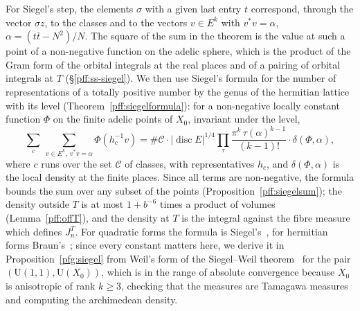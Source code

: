 \documentclass[10pt]{amsart}
\theoremstyle{definition}
\theoremstyle{remark}
\providecommand{\auU}{\mathrm U}
\begin{document}
For Siegel's step, the elements $\sigma$ with a given last entry $t$ correspond, through the
vector $\sigma z$, to the classes and to the vectors $v\in E^k$ with $v^*v=\alpha$,
$\alpha=(t\bar t-N^2)/N$. The square of the sum in the theorem is the value at such a point of a
non-negative function on the adelic sphere, which is the product of the Gram form of the orbital
integrals at the real places and of a pairing of orbital integrals at $T$
(\S\ref{pff:ss-siegel}). We then use Siegel's formula for the number of representations of a
totally positive number by the genus of the hermitian lattice with its level
(Theorem~\ref{pff:siegelformula}): for a non-negative locally constant function $\Phi$ on the
finite adelic points of $X_0$, invariant under the level,
\[
\sum_{c}\ \sum_{v\in E^k,\ v^*v=\alpha}\Phi(h_c^{-1}v)=\#\mathcal C\cdot|\operatorname{disc}E|^{1/4}
\prod_{\tau}\frac{\pi^k\,\tau(\alpha)^{k-1}}{(k-1)!}\cdot\delta(\Phi,\alpha),
\]
where $c$ runs over the set $\mathcal C$ of classes, with representatives $h_c$, and
$\delta(\Phi,\alpha)$ is the local density at the finite places. Since all terms are
non-negative, the formula bounds the sum over any subset of the points
(Proposition~\ref{pff:siegelsum}); the density outside $T$ is at most $1+b^{-6}$ times a product of volumes
(Lemma~\ref{pff:offT}), and the density at $T$ is the integral against the fibre measure which
defines $J^T_n$. For quadratic forms the formula is Siegel's~\cite{pff-Siegel35}, for hermitian forms
Braun's~\cite{pff-Braun41}; since every constant matters here, we derive it in
Proposition~\ref{pfg:siegel} from Weil's form of the Siegel--Weil
theorem~\cite{WeilSiegel} for the pair $(\auU(1,1),\auU(X_0))$, which is in the range of absolute
convergence because $X_0$ is anisotropic of rank $k\ge3$, checking that the measures are Tamagawa
measures and computing the archimedean density.
\end{document}
